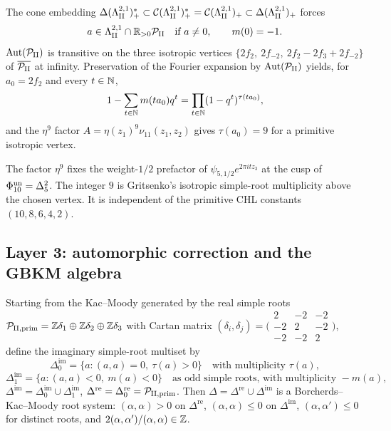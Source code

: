 \begin{theorem}
\label{thm:cone-embedding}
The cone embedding
$\Delta(\Lambda^{2,1}_{\mathrm{II}})^{*}_+ \subset \mathcal{C}(\Lambda^{2,1}_{\mathrm{II}})^{*}_+ = \mathcal{C}(\Lambda^{2,1}_{\mathrm{II}})_+
\subset \Delta(\Lambda^{2,1}_{\mathrm{II}})_+$ forces
\[
  a \in \Lambda^{2,1}_{\mathrm{II}} \cap \mathbb{R}_{>0}\mathcal{P}_{\mathrm{II}}
  \quad\text{if } a \neq 0, \qquad m(0) = -1.
\]
$\mathrm{Aut}(\mathcal{P}_{\mathrm{II}})$ is transitive on the three isotropic vertices
$\{2f_2,\ 2f_{-2},\ 2f_2 - 2f_3 + 2f_{-2}\}$ of $\overline{\mathcal{P}_{\mathrm{II}}}$
at infinity. Preservation of the Fourier expansion by $\mathrm{Aut}(\mathcal{P}_{\mathrm{II}})$
yields, for $a_0 = 2f_2$ and every $t \in \mathbb{N}$,
\[
  1 - \sum_{t \in \mathbb{N}} m(t a_0) q^t
  = \prod_{t \in \mathbb{N}} (1 - q^t)^{\tau(t a_0)},
\]
and the $\eta^9$ factor $A=\eta(z_1)^9\nu_{11}(z_1,z_2)$ gives
$\tau(a_0)=9$ for a primitive isotropic vertex.
\end{theorem}

\begin{remark}
The factor $\eta^9$ fixes the weight-$1/2$ prefactor of
$\psi_{5,1/2}e^{2\pi i t z_3}$ at the cusp of
$\Phi_{10}^{\mathrm{un}}=\Delta_5^2$. The integer $9$ is Gritsenko's
isotropic simple-root multiplicity above the chosen vertex. It is
independent of the primitive CHL constants $(10,8,6,4,2)$.
\end{remark}

\subsection{Layer 3: automorphic correction and the GBKM algebra}
\label{subsec:gbkm}

\begin{theorem}
\label{thm:imag-roots}
Starting from the Kac--Moody generated by the real simple roots
$\mathcal{P}_{\mathrm{II},\mathrm{prim}} = \mathbb{Z}\delta_1 \oplus \mathbb{Z}\delta_2 \oplus \mathbb{Z}\delta_3$ with
Cartan matrix
$(\delta_i, \delta_j) = \bigl(\begin{smallmatrix}2 & -2 & -2 \\ -2 & 2 & -2 \\ -2 & -2 & 2\end{smallmatrix}\bigr)$,
define the imaginary simple-root multiset by
\[
  \Delta^{\mathrm{im}}_0 = \{a : (a,a)=0,\ \tau(a)>0\}
  \quad\text{with multiplicity }\tau(a),
\]
\[
  \Delta^{\mathrm{im}}_1 = \{a : (a,a)<0,\ m(a)<0\}
  \quad\text{as odd simple roots, with multiplicity }-m(a),
\]
$\Delta^{\mathrm{im}} = \Delta^{\mathrm{im}}_0 \cup \Delta^{\mathrm{im}}_1$,
$\Delta^{\mathrm{re}} = \Delta^{\mathrm{re}}_0 = \mathcal{P}_{\mathrm{II},\mathrm{prim}}$.
Then $\Delta = \Delta^{\mathrm{re}} \cup \Delta^{\mathrm{im}}$ is a
Borcherds--Kac--Moody root system: $(\alpha,\alpha) > 0$ on
$\Delta^{\mathrm{re}}$, $(\alpha,\alpha) \leq 0$ on
$\Delta^{\mathrm{im}}$, $(\alpha, \alpha') \leq 0$ for distinct roots,
and $2(\alpha, \alpha')/(\alpha, \alpha) \in \mathbb{Z}$.
\end{theorem}

